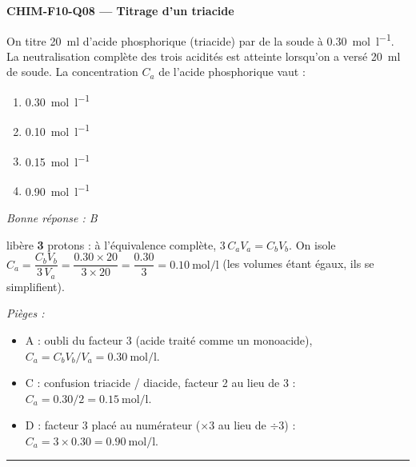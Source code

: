 \documentclass[11pt,a4paper]{article}
\begin{document}
\noindent\textbf{CHIM-F10-Q08 --- Titrage d'un triacide}\par
On titre \qty{20}{\milli\litre} d'acide phosphorique  (triacide) par de la soude  à \qty{0.30}{\mol\per\litre}. La neutralisation complète des trois acidités est atteinte lorsqu'on a versé \qty{20}{\milli\litre} de soude. La concentration $C_a$ de l'acide phosphorique vaut :
\begin{enumerate}[label=\Alph*)]
\item \qty{0.30}{\mol\per\litre}
\item \qty{0.10}{\mol\per\litre}
\item \qty{0.15}{\mol\per\litre}
\item \qty{0.90}{\mol\per\litre}
\end{enumerate}
\textit{Bonne réponse : B}\par
{} libère \textbf{3} protons : à l'équivalence complète, $3\,C_a V_a = C_b V_b$. On isole $C_a = \dfrac{C_b V_b}{3\,V_a} = \dfrac{\num{0.30}\times\num{20}}{3\times\num{20}} = \dfrac{\num{0.30}}{3} = \qty{0.10}{\mol\per\litre}$ (les volumes étant égaux, ils se simplifient).\par
\textit{Pièges :}
\begin{itemize}
\item A : oubli du facteur 3 (acide traité comme un monoacide), $C_a = C_b V_b/V_a = \qty{0.30}{\mol\per\litre}$.
\item C : confusion triacide / diacide, facteur 2 au lieu de 3 : $C_a = \num{0.30}/2 = \qty{0.15}{\mol\per\litre}$.
\item D : facteur 3 placé au numérateur ($\times 3$ au lieu de $\div 3$) : $C_a = 3\times\num{0.30} = \qty{0.90}{\mol\per\litre}$.
\end{itemize}
\vspace{6pt}\hrule\vspace{8pt}
\end{document}
